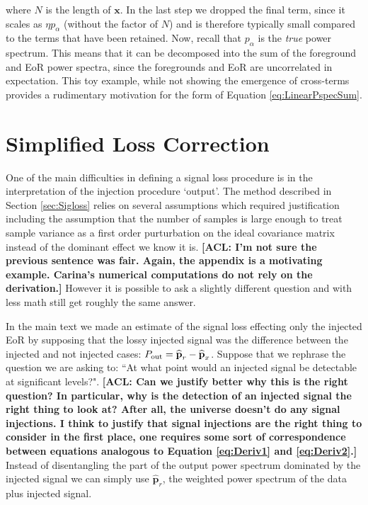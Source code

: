\documentclass[preprint2,numberedappendix,tighten]{aastex6}  %
\newcommand{\x}{\mathbf{x}}
\newcommand{\acl}[1]{{\color{red} \textbf{[ACL:  #1]}}}
\begin{document}
where $N$ is the length of $\x$. In the last step we dropped the final term, since it scales as $\eta p_\alpha$ (without the factor of $N$) and is therefore typically small compared to the terms that have been retained. Now, recall that $p_\alpha$ is the \emph{true} power spectrum. This means that it can be decomposed into the sum of the foreground and EoR power spectra, since the foregrounds and EoR are uncorrelated in expectation. This toy example, while not showing the emergence of cross-terms provides a rudimentary motivation for the form of Equation \eqref{eq:LinearPspecSum}. 



\section{Simplified Loss Correction}
\label{sec:Pr_appendix}
One of the main difficulties in defining a signal loss procedure is in the interpretation of the injection procedure `output'. The method described in Section \ref{sec:Sigloss} relies on several assumptions which required justification including the assumption that the number of samples is large enough to treat sample variance as a first order purturbation on the ideal covariance matrix instead of the dominant effect we know it is. \acl{I'm not sure the previous sentence was fair. Again, the appendix is a motivating example. Carina's numerical computations do not rely on the derivation.} However it is possible to ask a slightly different question and with less math still get roughly the same answer.

In the main text we made an estimate of the signal loss effecting only the injected EoR by supposing that the lossy injected signal was the difference between the injected and not injected cases: $P_{\rm out} = \widehat{\textbf{p}}_{r} - \widehat{\textbf{p}}_{x}$. Suppose that we rephrase the question we are asking to: ``At what point would an injected signal be detectable at significant levels?". \acl{Can we justify better why this is the right question? In particular, why is the detection of an injected signal the right thing to look at? After all, the universe doesn't do any signal injections. I think to justify that signal injections are the right thing to consider in the first place, one requires some sort of correspondence between equations analogous to Equation \eqref{eq:Deriv1} and \eqref{eq:Deriv2}.} Instead of disentangling the part of the output power spectrum dominated by the injected signal we can simply use $\widehat{\textbf{p}}_{r}$, the weighted power spectrum of the data plus injected signal.
  
\end{document}

